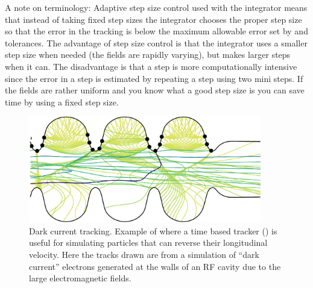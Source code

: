 A note on terminology: Adaptive step size control used with the  integrator means
that instead of taking fixed step sizes the integrator chooses the proper step size so that the
error in the tracking is below the maximum allowable error set by  and 
tolerances. The advantage of step size control is that the integrator uses a smaller step size when
needed (the fields are rapidly varying), but makes larger steps when it can. The disadvantage is
that a step is more computationally intensive since the error in a step is estimated by repeating a
step using two mini steps. If the fields are rather uniform and you know what a good step size is
you can save time by using a fixed step size.

\begin{figure}[tb]
  \centering
  \includegraphics[width=4in]{dark-current.pdf}
  \caption[Dark current tracking.]{
Dark current tracking. Example of where a time based tracker () is useful for
simulating particles that can reverse their longitudinal velocity. Here the tracks drawn are from a
simulation of ``dark current'' electrons generated at the walls of an RF cavity due to the large
electromagnetic fields.  }
  \label{f:dark.current}
\end{figure}

